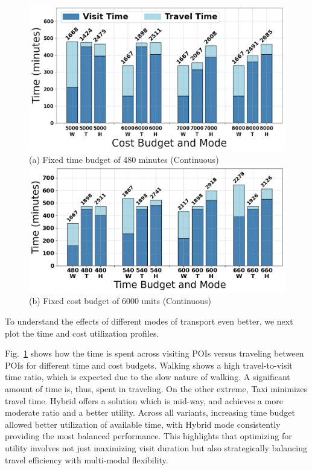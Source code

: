 \begin{figure}[t]
\centering
\includegraphics[width=\figwidth]{plots/tu1.png} \\
(a) Fixed time budget of 480 minutes (Continuous)
\includegraphics[width=\figwidth]{plots/tu2.png} \\
(b) Fixed cost budget of 6000 units (Continuous)
\label{fig:time-utilization}
\end{figure}

To understand the effects of different modes of transport even better, we next plot the time and cost utilization profiles.

Fig.~\ref{fig:time-utilization} shows how the time is spent across visiting POIs versus traveling between POIs for different time and cost budgets.
Walking shows a high travel-to-visit time ratio, which is expected due to the slow nature of walking. A significant amount of time is, thus, spent in traveling. On the other extreme, Taxi minimizes travel time. Hybrid offers a solution which is mid-way, and achieves a more moderate ratio and a better utility.
Across all variants, increasing time budget allowed better utilization of available time, with Hybrid mode consistently providing the most balanced performance. This highlights that optimizing for utility involves not just maximizing visit duration but also strategically balancing travel efficiency with multi-modal flexibility.

